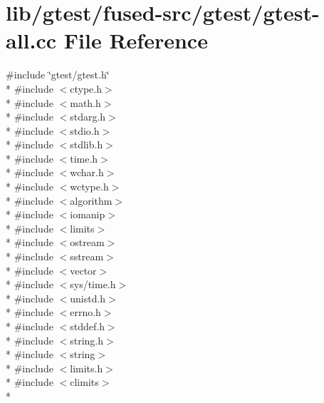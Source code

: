 \hypertarget{fused-src_2gtest_2gtest-all_8cc}{\section{lib/gtest/fused-\/src/gtest/gtest-\/all.cc File Reference}
\label{fused-src_2gtest_2gtest-all_8cc}
}
{\ttfamily \#include \char`\"{}gtest/gtest.\-h\char`\"{}}\\*
{\ttfamily \#include $<$ctype.\-h$>$}\\*
{\ttfamily \#include $<$math.\-h$>$}\\*
{\ttfamily \#include $<$stdarg.\-h$>$}\\*
{\ttfamily \#include $<$stdio.\-h$>$}\\*
{\ttfamily \#include $<$stdlib.\-h$>$}\\*
{\ttfamily \#include $<$time.\-h$>$}\\*
{\ttfamily \#include $<$wchar.\-h$>$}\\*
{\ttfamily \#include $<$wctype.\-h$>$}\\*
{\ttfamily \#include $<$algorithm$>$}\\*
{\ttfamily \#include $<$iomanip$>$}\\*
{\ttfamily \#include $<$limits$>$}\\*
{\ttfamily \#include $<$ostream$>$}\\*
{\ttfamily \#include $<$sstream$>$}\\*
{\ttfamily \#include $<$vector$>$}\\*
{\ttfamily \#include $<$sys/time.\-h$>$}\\*
{\ttfamily \#include $<$unistd.\-h$>$}\\*
{\ttfamily \#include $<$errno.\-h$>$}\\*
{\ttfamily \#include $<$stddef.\-h$>$}\\*
{\ttfamily \#include $<$string.\-h$>$}\\*
{\ttfamily \#include $<$string$>$}\\*
{\ttfamily \#include $<$limits.\-h$>$}\\*
{\ttfamily \#include $<$climits$>$}\\*
